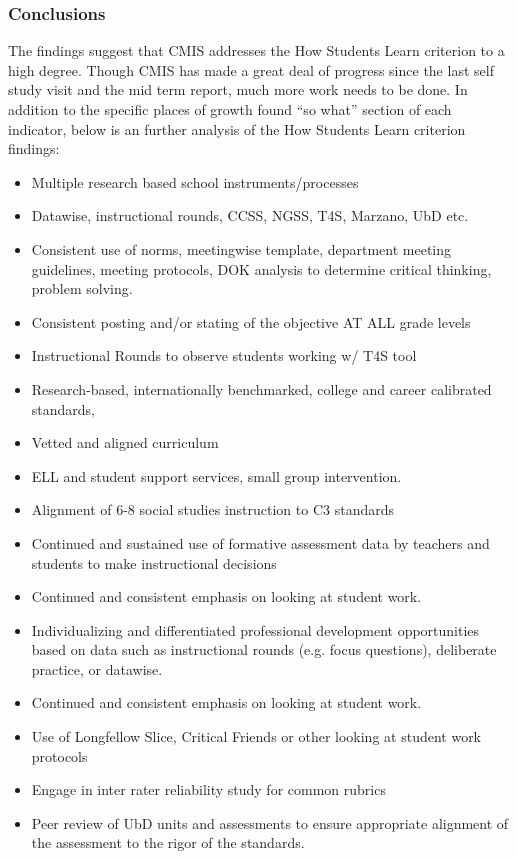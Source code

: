 \subsubsection{Conclusions}

\begin{findings}

The findings suggest that CMIS addresses the How Students Learn criterion to a high degree. Though CMIS has made a great deal of progress since the last self study visit and the mid term report, much more work needs to be done. In addition to the specific places of growth found “so what” section of each indicator, below is an further analysis of the How Students Learn criterion findings:

\begin{itemize}
\item Multiple research based school instruments/processes
\item Datawise, instructional rounds, CCSS, NGSS, T4S, Marzano, UbD etc. 
\item Consistent use of norms, meetingwise template, department meeting guidelines, meeting protocols, DOK analysis to determine critical thinking, problem solving.
\item Consistent posting and/or stating of the objective AT ALL grade levels
\item Instructional Rounds to observe students working w/ T4S tool
\item Research-based, internationally benchmarked, college and career calibrated standards, 
\item Vetted and aligned curriculum
\item ELL and student support services, small group intervention. 
\end{itemize}


\begin{itemize}
\item Alignment of 6-8 social studies instruction to C3 standards
\item Continued and sustained use of formative assessment data by teachers and students to make instructional decisions
\item Continued and consistent emphasis on looking at student work. 
\item Individualizing and differentiated professional development opportunities based on data such as instructional rounds (e.g. focus questions), deliberate practice, or datawise. 
\item Continued and consistent emphasis on looking at student work. 
\item Use of Longfellow Slice, Critical Friends or other looking at student work protocols 
\item Engage in inter rater reliability study for common rubrics
\item Peer review of UbD units and assessments  to ensure appropriate alignment of the assessment to the rigor of the standards. 
\end{itemize}
\end{findings}

